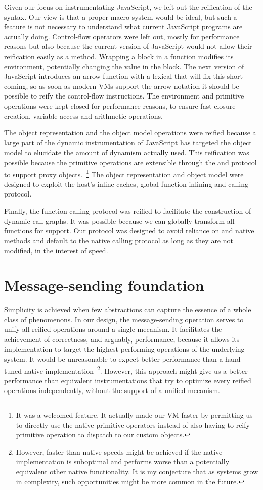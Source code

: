 Given our focus on instrumentating JavaScript, we left out the reification of
the syntax. Our view is that a proper macro system would be ideal, but such a
feature is not necessary to understand what current JavaScript programs are
actually doing. Control-flow operators were left out, mostly for performance
reasons but also because the current version of JavaScript would not allow
their reification easily as a method. Wrapping a block in a function modifies
its environment, potentially changing the  value in the block. The
next version of JavaScript introduces an arrow function with a lexical
 that will fix this short-coming, so as soon as modern VMs support the
arrow-notation it should be possible to reify the control-flow instructions.
The environment and primitive operations were kept closed for performance
reasons, to ensure fast closure creation, variable access and arithmetic
operations.

The object representation and the object model operations were reified because
a large part of the dynamic instrumentation of JavaScript has targeted the
object model to elucidate the amount of dynamism actually used. This
reification was possible because the primitive operations are extensible
through the  and  protocol to support proxy
objects.~\footnote{It was a welcomed feature. It actually made our VM faster by
permitting us to directly use the native primitive operators instead of also
having to reify primitive operation to dispatch to our custom objects.} The
object representation and object model were designed to exploit the host's
inline caches, global function inlining and calling protocol.  

Finally, the function-calling protocol was reified to facilitate the
construction of dynamic call graphs. It was possible because we can globally
transform all functions for support. Our protocol was designed to avoid
reliance on  and  native methods and default to the
native calling protocol as long as they are not modified, in the interest of
speed.

\section{Message-sending foundation}
Simplicity is achieved when few abstractions can capture the essence of a whole
class of phenomenons. In our design, the message-sending operation serves to
unify all reified operations around a single mecanism. It facilitates the
achievement of correctness, and arguably, performance, because it allows its
implementation to target the highest performing operations of the underlying
system. It would be unreasonable to expect better performance than a hand-tuned
native implementation~\footnote{However, faster-than-native
speeds might be achieved if the native implementation is suboptimal and performs
worse than a potentially equivalent other native functionality. It is my
conjecture that as systems grow in complexity, such opportunities might be
more common in the future.}. However, this approach might give us a better
performance than equivalent instrumentations that try to optimize every reified
operations independently, without the support of a unified mecanism.

